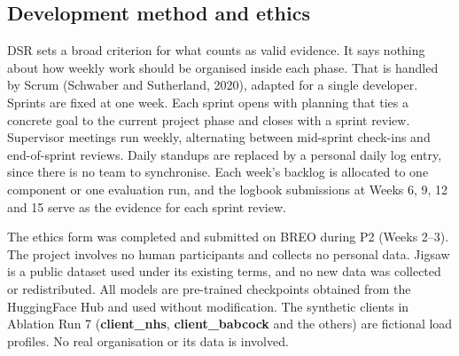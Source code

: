 \hypertarget{development-method-and-ethics}{%
\subsection{Development method and
ethics}\label{development-method-and-ethics}}

DSR sets a broad criterion for what counts as valid evidence. It says
nothing about how weekly work should be organised inside each phase. That
is handled by Scrum (Schwaber and Sutherland, 2020), adapted for a single
developer. Sprints are fixed at one week. Each sprint opens with planning
that ties a concrete goal to the current project phase and closes with a
sprint review. Supervisor meetings run weekly, alternating between
mid-sprint check-ins and end-of-sprint reviews. Daily standups are
replaced by a personal daily log entry, since there is no team to
synchronise. Each week's backlog is allocated to one component or one
evaluation run, and the logbook submissions at Weeks 6, 9, 12 and 15
serve as the evidence for each sprint review.

The ethics form was completed and submitted on BREO during P2 (Weeks
2--3). The project involves no human participants and collects no
personal data. Jigsaw is a public dataset used under its existing terms,
and no new data was collected or redistributed. All models are
pre-trained checkpoints obtained from the HuggingFace Hub and used
without modification. The synthetic clients in Ablation Run 7
(\textbf{client\_nhs}, \textbf{client\_babcock} and the others) are
fictional load profiles. No real organisation or its data is
involved.
